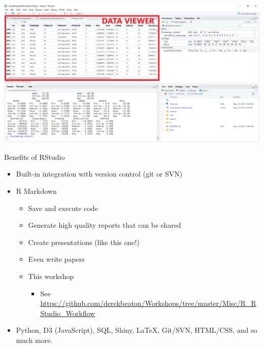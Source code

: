 \documentclass[
  ignorenonframetext,
]{beamer}
\providecommand{\tightlist}{%
  \setlength{\itemsep}{0pt}\setlength{\parskip}{0pt}}
\begin{document}
\begin{frame}

\includegraphics{../external/images/rstudio_terminal_5_DATA.png}

\end{frame}

\begin{frame}{Benefits of RStudio}
\protect\hypertarget{benefits-of-rstudio}{}

\begin{itemize}[<+->]
\tightlist
\item
  Built-in integration with version control (git or SVN)
\item
  R Markdown

  \begin{itemize}[<+->]
  \tightlist
  \item
    Save and execute code
  \item
    Generate high quality reports that can be shared
  \item
    Create presentations (like this one!)
  \item
    Even write papers
  \item
    This workshop

    \begin{itemize}[<+->]
    \tightlist
    \item
      See
      \url{https://github.com/derekbeaton/Workshops/tree/master/Misc/R_RStudio_Workflow}
    \end{itemize}
  \end{itemize}
\item
  Python, D3 (JavaScript), SQL, Shiny, LaTeX, Git/SVN, HTML/CSS, and so
  much more.
\end{itemize}

\end{frame}
\end{document}
